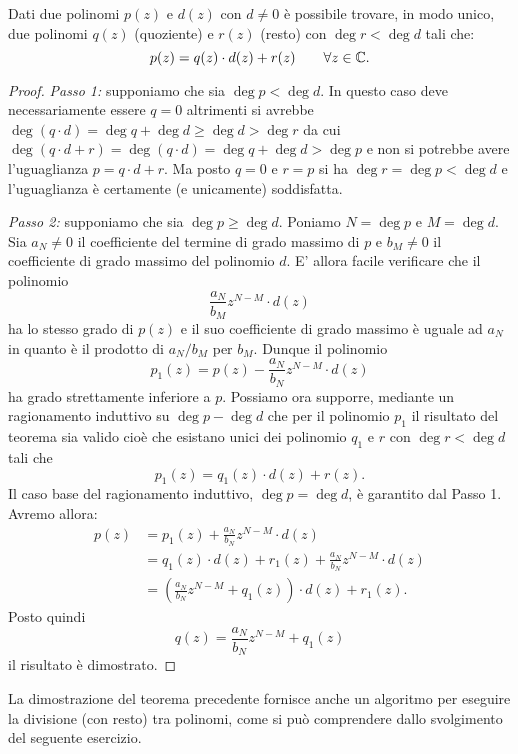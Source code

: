 \begin{theorem}
Dati due polinomi $p(z)$ e $d(z)$ con $d\neq 0$ è possibile trovare, in modo unico, due polinomi $q(z)$ (quoziente) e $r(z)$ (resto) con $\deg r < \deg d$
tali che:
\[
  p(z) = q(z) \cdot d(z) + r(z) \qquad \forall z\in \mathbb C.
\]
\end{theorem}
%
\begin{proof}
\emph{Passo 1:} supponiamo che sia $\deg p < \deg d$.
In questo caso deve necessariamente essere $q=0$ altrimenti si avrebbe $\deg (q\cdot d) = \deg q + \deg d \ge \deg d > \deg r$ da cui
$\deg (q\cdot d + r) = \deg(q\cdot d) = \deg q + \deg d > \deg p$ e non si potrebbe avere l'uguaglianza $p = q\cdot d + r$.
Ma posto $q=0$ e $r=p$ si ha $\deg r = \deg p < \deg d$ e l'uguaglianza è certamente (e unicamente) soddisfatta.

\emph{Passo 2:} supponiamo che sia $\deg p \ge \deg d$.
Poniamo $N=\deg p$ e $M=\deg d$. Sia $a_N\neq 0$ il coefficiente del termine di grado massimo di $p$ e $b_M\neq 0$ il coefficiente di grado massimo del polinomio $d$.
E' allora facile verificare che il polinomio
\[
\frac{a_N}{b_M} z^{N-M}\cdot d(z)
\]
ha lo stesso grado di $p(z)$ e il suo coefficiente di grado massimo è uguale ad $a_N$ in quanto è il prodotto di $a_N/b_M$ per $b_M$.
Dunque il polinomio
\[
 p_1(z) = p(z) - \frac{a_N}{b_N} z^{N-M}\cdot d(z)
\]
ha grado strettamente inferiore a $p$.
Possiamo ora supporre, mediante un ragionamento induttivo su $\deg p - \deg d$
che per il polinomio $p_1$ il risultato del teorema sia valido cioè
che esistano unici dei polinomio $q_1$ e $r$ con $\deg r < \deg d$ tali che
\[
  p_1(z) = q_1(z) \cdot d(z) + r(z).
\]
Il caso base del ragionamento induttivo, $\deg p = \deg d$, è garantito dal Passo 1.
Avremo allora:
\begin{align*}
  p(z) &= p_1(z) + \frac{a_N}{b_N} z^{N-M}\cdot d(z)\\
       &= q_1(z) \cdot d(z) + r_1(z) + \frac{a_N}{b_N} z^{N-M}\cdot d(z)\\
       &= (\frac{a_N}{b_N} z^{N-M} + q_1(z)) \cdot d(z) + r_1(z).
\end{align*}
Posto quindi
\[
 q(z) = \frac{a_N}{b_N} z^{N-M} + q_1(z)
\]
il risultato è dimostrato.
\end{proof}

La dimostrazione del teorema precedente fornisce anche un algoritmo per eseguire la divisione (con resto) tra polinomi, come si può comprendere dallo svolgimento del seguente esercizio.

